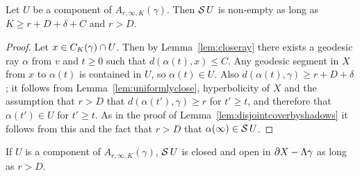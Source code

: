 \begin{lem}\label{lem:nonemptyshadows} Let $U$ be a component of $A_{r, \infty,
K}(\gamma)$. Then $\operatorname{\mathcal{S}} U$ is non-empty as long as $K \geq r + D + \delta +
C$ and $r > D$.  \end{lem}

\begin{proof} Let $x \in C_K(\gamma) \cap U$. Then by
Lemma~\ref{lem:closeray} there exists a geodesic ray $\alpha$ from $v$ and $t
\geq 0$ such that $d(\alpha(t), x) \leq C$. Any geodesic segment in $X$ from
$x$ to $\alpha(t)$ is contained in $U$, so $\alpha(t) \in U$. Also
$d(\alpha(t), \gamma) \geq r + D + \delta$; it follows from
Lemma~\ref{lem:uniformlyclose}, hyperbolicity of $X$ and the assumption that
$r > D$ that $d(\alpha(t'), \gamma) \geq r$ for $t' \geq t$, and therefore
that $\alpha(t') \in U$ for $t' \geq t$. As in the proof of
Lemma~\ref{lem:disjointcoverbyshadows} it follows from this and the fact that
$r > D$ that $\alpha(\infty) \in \operatorname{\mathcal{S}} U$.\end{proof}

\begin{lem}\label{lem:shadowsclopen} If $U$ is a component of $A_{r, \infty,
K}(\gamma)$, $\operatorname{\mathcal{S}} U$ is closed and open in $\partial X - \Lambda\gamma$ as
long as $r > D$. \end{lem}

